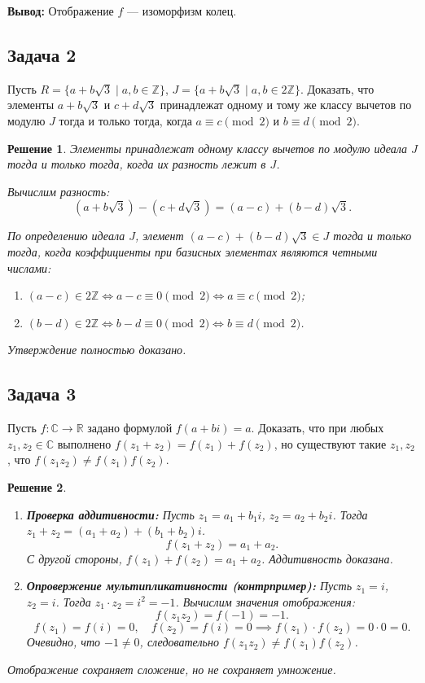 \documentclass[14pt]{article}
\newtheorem*{solution}{Решение}
\begin{document}
	\textbf{Вывод:} Отображение $f$ — изоморфизм колец.
	
	\subsection*{Задача 2}
	Пусть $R = \{ a + b\sqrt{3} \mid a, b \in \mathbb{Z} \}$, $J = \{ a + b\sqrt{3} \mid a, b \in 2\mathbb{Z} \}$. Доказать, что элементы $a + b\sqrt{3}$ и $c + d\sqrt{3}$ принадлежат одному и тому же классу вычетов по модулю $J$ тогда и только тогда, когда $a \equiv c \pmod{2}$ и $b \equiv d \pmod{2}$.
	
	\begin{solution}
		Элементы принадлежат одному классу вычетов по модулю идеала $J$ тогда и только тогда, когда их разность лежит в $J$.
		
		Вычислим разность:
		\[
		(a + b\sqrt{3}) - (c + d\sqrt{3}) = (a - c) + (b - d)\sqrt{3}.
		\]
		
		По определению идеала $J$, элемент $(a - c) + (b - d)\sqrt{3} \in J$ тогда и только тогда, когда коэффициенты при базисных элементах являются четными числами:
		\begin{enumerate}
			\item $(a - c) \in 2\mathbb{Z} \iff a - c \equiv 0 \pmod{2} \iff a \equiv c \pmod{2}$;
			\item $(b - d) \in 2\mathbb{Z} \iff b - d \equiv 0 \pmod{2} \iff b \equiv d \pmod{2}$.
		\end{enumerate}
		
		Утверждение полностью доказано.
	\end{solution}
	
	\subsection*{Задача 3}
	Пусть $f: \mathbb{C} \to \mathbb{R}$ задано формулой $f(a + bi) = a$. Доказать, что при любых $z_1, z_2 \in \mathbb{C}$ выполнено $f(z_1 + z_2) = f(z_1) + f(z_2)$, но существуют такие $z_1, z_2$, что $f(z_1 z_2) \neq f(z_1)f(z_2)$.
	
	\begin{solution}
		\begin{enumerate}
			\item \textbf{Проверка аддитивности:}
			Пусть $z_1 = a_1 + b_1 i$, $z_2 = a_2 + b_2 i$. Тогда $z_1 + z_2 = (a_1 + a_2) + (b_1 + b_2)i$.
			\[
			f(z_1 + z_2) = a_1 + a_2.
			\]
			С другой стороны, $f(z_1) + f(z_2) = a_1 + a_2$. Аддитивность доказана.
			
			\item \textbf{Опровержение мультипликативности (контрпример):}
			Пусть $z_1 = i$, $z_2 = i$. Тогда $z_1 \cdot z_2 = i^2 = -1$.
			Вычислим значения отображения:
			\[
			f(z_1 z_2) = f(-1) = -1.
			\]
			\[
			f(z_1) = f(i) = 0, \quad f(z_2) = f(i) = 0 \implies f(z_1) \cdot f(z_2) = 0 \cdot 0 = 0.
			\]
			Очевидно, что $-1 \neq 0$, следовательно $f(z_1 z_2) \neq f(z_1)f(z_2)$.
		\end{enumerate}
		Отображение сохраняет сложение, но не сохраняет умножение.
	\end{solution}
	
\end{document}
